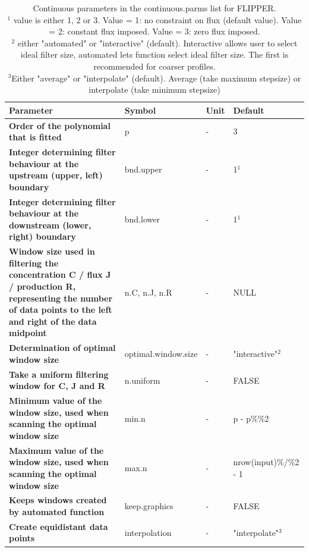 \documentclass[10pt]{article}
\begin{document}
\begin{table}[!h]
	\small
	\caption{Continuous parameters in the continuous.parms list for FLIPPER.\\ $^{1}$ value is either  1, 2 or 3. Value = 1: no constraint on flux (default value). Value = 2: constant flux imposed. Value = 3: zero flux imposed. \\ $^{2}$ either "automated" or "interactive" (default). Interactive allows user to select ideal filter size, automated lets function select ideal filter size. The first is recommended for coarser profiles. \\ $^{3}$Either "average" or "interpolate" (default). Average (take maximum stepsize) or interpolate (take minimum stepsize)}
	\begin{tabular}{p{8cm} p{1.7cm} p{1cm} p{2.5cm}}
		\hline
		\textbf{Parameter} & \textbf{Symbol} & \textbf{Unit} & \textbf{Default} \\     
		 \hline
		\textbf{Order of the polynomial that is fitted} & p & - & 3  \\
        \textbf{Integer determining filter behaviour at the upstream (upper, left) boundary} & bnd.upper & - & 1$^{1}$  \\	
        \textbf{Integer determining filter behaviour at the downstream (lower, right) boundary} & bnd.lower & - & 1$^{1}$  \\	
        \textbf{Window size used in filtering the concentration C / flux J / production R, representing the number of data points to the left and right of the data midpoint} & n.C, n.J, n.R & - & NULL  \\	
        \textbf{Determination of optimal window size} & optimal.window.size & - & "interactive"$^{2}$   \\	
        \textbf{Take a uniform filtering window for C, J and R} & n.uniform & - & FALSE  \\
        \textbf{Minimum value of the window size, used when scanning the optimal window size} & min.n & - & p - p\%\%2  \\	
        \textbf{Maximum value of the window size, used when scanning the optimal window size} & max.n & - & nrow(input)\%/\%2 - 1  \\	
        \textbf{Keeps windows created by automated function} & keep.graphics & - & FALSE  \\	
        \textbf{Create equidistant data points} & interpolation & - & "interpolate"$^{3}$  \\

		\hline
	\end{tabular}
	\label{table_continuousparms}
\end{table}
\end{document}
